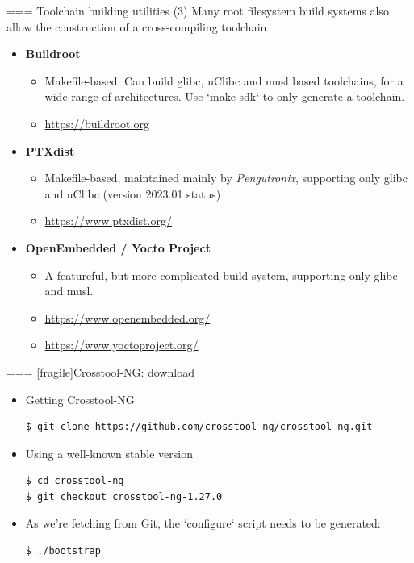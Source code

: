 === Toolchain building utilities (3)
Many root filesystem build systems also allow the construction of a cross-compiling toolchain
\begin{itemize}
\item {\bf Buildroot}
  \begin{itemize}
  \item Makefile-based. Can build glibc, uClibc and musl based
    toolchains, for a wide range of architectures. Use `make sdk`
    to only generate a toolchain.
  \item \url{https://buildroot.org}
  \end{itemize}
\item {\bf PTXdist}
  \begin{itemize}
  \item Makefile-based, maintained mainly by {\em Pengutronix},
        supporting only glibc and uClibc (version 2023.01 status)
  \item \url{https://www.ptxdist.org/}
  \end{itemize}
\item {\bf OpenEmbedded / Yocto Project}
  \begin{itemize}
  \item A featureful, but more complicated build system, supporting only
        glibc and musl.
  \item \url{https://www.openembedded.org/}
  \item \url{https://www.yoctoproject.org/}
  \end{itemize}
\end{itemize}


=== [fragile]{Crosstool-NG: download}
  \begin{itemize}
  \item Getting Crosstool-NG
\begin{verbatim}
$ git clone https://github.com/crosstool-ng/crosstool-ng.git
\end{verbatim}
  \item Using a well-known stable version
\begin{verbatim}
$ cd crosstool-ng
$ git checkout crosstool-ng-1.27.0
\end{verbatim}
  \item As we're fetching from Git, the `configure` script needs
    to be generated:
\begin{verbatim}
$ ./bootstrap
\end{verbatim}
  \end{itemize}


